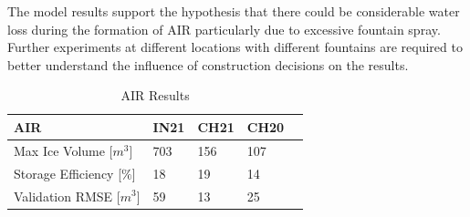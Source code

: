 \documentclass[utf8]{frontiersSCNS} %
\begin{document}
The model results support the hypothesis that there could be considerable water loss during the formation of AIR
particularly due to excessive fountain spray. Further experiments at different locations with different fountains are
required to better understand the influence of construction decisions on the results. 

\begin{table}
\centering
\caption{AIR Results}
\label{tab:results}
\begin{tabular}{@{}|l|l|l|l|l|@{}}
\toprule
\textbf{AIR}   & \textbf{IN21} & \textbf{CH21} & \textbf{CH20} \\ \midrule
Max Ice Volume [$m^3$] & 703             & 156             & 107             \\ \midrule
Storage Efficiency [$\%$] & 18             & 19             & 14             \\ \midrule
Validation RMSE [$m^3$] & 59             & 13             & 25               \\ \bottomrule
\end{tabular}
\end{table}



\end{document}
